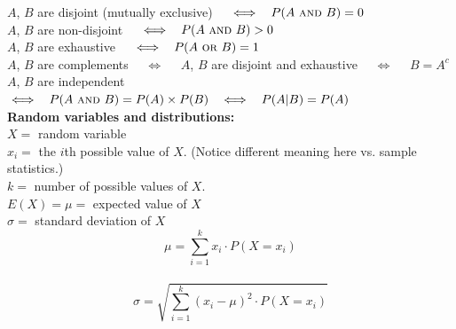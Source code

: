\documentclass[12pt,letterpaper,addpoints]{exam}
\begin{document}
\noindent
$A$, $B$ are disjoint (mutually exclusive) ~~$\iff~~P(A~\textsc{and}~ B) = 0$\\
$A$, $B$ are non-disjoint ~~$\iff~~P(A~\textsc{and}~ B) > 0$\\
$A$, $B$ are exhaustive ~~$\iff~~P(A~\textsc{or}~ B) = 1$\\
$A$, $B$ are complements ~~$\iff$~~ $A$, $B$ are disjoint and exhaustive ~~$\iff$~~ $B=A^c$\\
$A$, $B$ are independent ~~$\iff~~P(A~\textsc{and}~ B) = P(A)\times P(B) ~~\iff~~ P(A|B)=P(A)$\\

{\bf Random variables and distributions:}\\
$X=$ random variable \\
$x_i=$ the $i$th possible value of $X$. (Notice different meaning here {vs.} sample statistics.)\\
$k=$ number of possible values of $X$.\\
$E(X)=\mu=$ expected value of $X$\\
$\sigma=$ standard deviation of $X$
$$\mu = \sum\limits_{i=1}^k  x_i \cdot P(X=x_i) $$\\
$$\sigma = \sqrt{\sum\limits_{i=1}^k (x_i-\mu)^2 \cdot P(X=x_i)}$$
\end{document}
